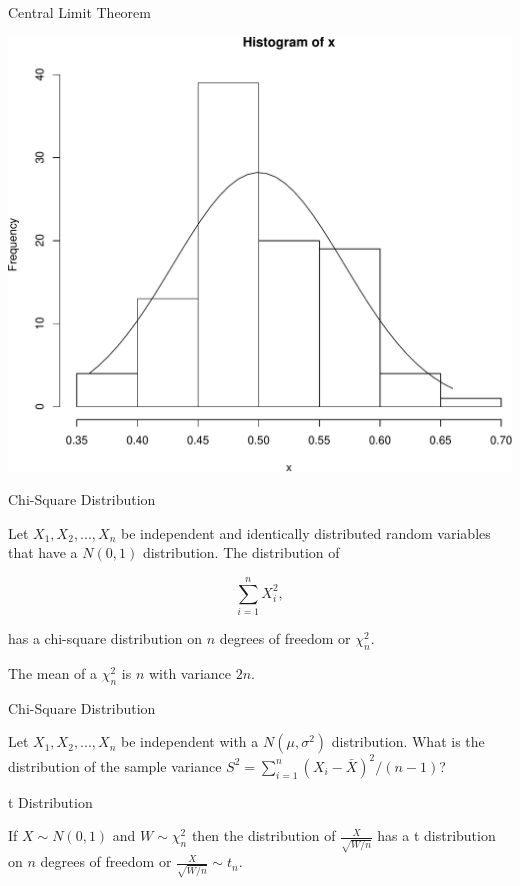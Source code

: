 \documentclass[9pt,ignorenonframetext,]{beamer}
\begin{document}
\begin{frame}{Central Limit Theorem}

\includegraphics{class2-jan11_files/figure-beamer/unnamed-chunk-11-1.pdf}

\end{frame}

\begin{frame}{Chi-Square Distribution}

Let \(X_1, X_2, ..., X_n\) be independent and identically distributed
random variables that have a \(N(0,1)\) distribution. The distribution
of

\[ \sum_{i=1}^{n}X_i^2,\]

has a chi-square distribution on \(n\) degrees of freedom or
\(\chi^2_{n}\).

The mean of a \(\chi^2_{n}\) is \(n\) with variance \(2n\).

\end{frame}

\begin{frame}{Chi-Square Distribution}

Let \(X_1,X_2,...,X_n\) be independent with a \(N(\mu, \sigma^2)\)
distribution. What is the distribution of the sample variance
\(S^2=\sum_{i=1}^{n}(X_i-{\bar X})^2/(n-1)\)?

\end{frame}

\begin{frame}{t Distribution}

If \(X \sim N(0,1)\) and \(W \sim \chi^2_n\) then the distribution of
\(\frac{X}{\sqrt{W/n}}\) has a t distribution on \(n\) degrees of
freedom or \(\frac{X}{\sqrt{W/{n}}} \sim t_n\).

\end{frame}
\end{document}
